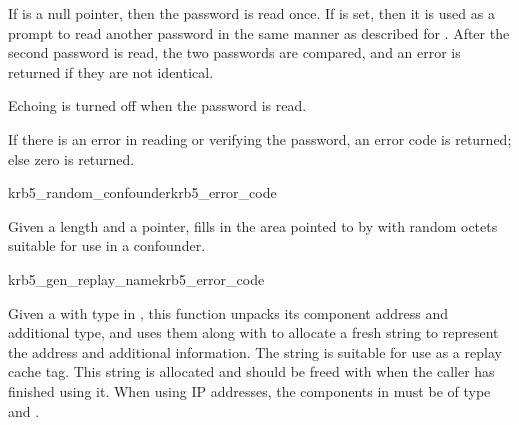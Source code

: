 If  is a null pointer, then the password is read
once.  If  is set, then it is used as a prompt to
read another password in the same manner as described for
.  After the second password is read, the two
passwords are compared, and an error is returned if they are not
identical.

Echoing is turned off when the password is read.

If there is an error in reading or verifying the password, an error code
is returned; else zero is returned.


\begin{funcdecl}{krb5_random_confounder}{krb5_error_code}{\funcin}
\funcout
{}
\end{funcdecl}

Given a length and a pointer, fills in the area pointed to by
 with  random octets suitable for use
in a confounder.

\begin{funcdecl}{krb5_gen_replay_name}{krb5_error_code}{\funcin}
\funcout
{}
\end{funcdecl}

Given a  with type 
in , this function unpacks its component address and
additional type, and uses them along with  to allocate a
fresh string to represent the address and additional information.  The
string is suitable for use as a replay cache tag.  This string is
allocated and should be freed with  when the caller has
finished using it.  When using IP addresses, the components in
 must be of type
 and .

